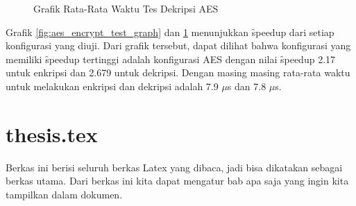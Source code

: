\begin{figure}
    \centering
    \caption{Grafik Rata-Rata Waktu Tes Dekripsi AES}
    \label{fig:aes_decrypt_test_graph}
\end{figure}

Grafik \ref{fig:aes_encrypt_test_graph} dan \ref{fig:aes_decrypt_test_graph} menunjukkan \f{speedup} dari setiap konfigurasi yang diuji. Dari grafik tersebut, dapat dilihat bahwa konfigurasi yang memiliki \f{speedup} tertinggi adalah konfigurasi AES dengan nilai \f{speedup} 2.17 untuk enkripsi dan 2.679 untuk dekripsi. Dengan masing masing rata-rata waktu untuk melakukan enkripsi dan dekripsi adalah 7.9 $\mu$s dan 7.8 $\mu$s.


\iffalse

    \section{thesis.tex}
    Berkas ini berisi seluruh berkas Latex yang dibaca, jadi bisa dikatakan sebagai
    berkas utama. Dari berkas ini kita dapat mengatur bab apa saja yang ingin
    kita tampilkan dalam dokumen.



